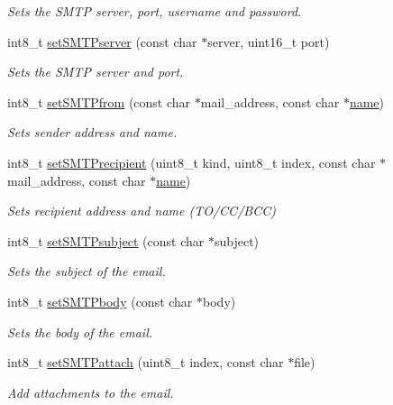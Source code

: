 \begin{DoxyCompactItemize}
\begin{DoxyCompactList}\small\item\em Sets the S\+M\+TP server, port, username and password. \end{DoxyCompactList}\item 
int8\+\_\+t \hyperlink{class_wasp3_g_aae87c677ac1163d85ee5a6ad417bd3da}{set\+S\+M\+T\+Pserver} (const char $\ast$server, uint16\+\_\+t port)
\begin{DoxyCompactList}\small\item\em Sets the S\+M\+TP server and port. \end{DoxyCompactList}\item 
int8\+\_\+t \hyperlink{class_wasp3_g_a442c2693f06c4e3c75d363ac1c715e9a}{set\+S\+M\+T\+Pfrom} (const char $\ast$mail\+\_\+address, const char $\ast$\hyperlink{_sd_fat_structs_8h_a30308c9b983377042fd2cc8900454fb1}{name})
\begin{DoxyCompactList}\small\item\em Sets sender address and name. \end{DoxyCompactList}\item 
int8\+\_\+t \hyperlink{class_wasp3_g_ad021733d2aa274a2d88cc512c1e4f8df}{set\+S\+M\+T\+Precipient} (uint8\+\_\+t kind, uint8\+\_\+t index, const char $\ast$mail\+\_\+address, const char $\ast$\hyperlink{_sd_fat_structs_8h_a30308c9b983377042fd2cc8900454fb1}{name})
\begin{DoxyCompactList}\small\item\em Sets recipient address and name (T\+O/\+C\+C/\+B\+CC) \end{DoxyCompactList}\item 
int8\+\_\+t \hyperlink{class_wasp3_g_ae6635051b128026ad05798d2a5bf4c24}{set\+S\+M\+T\+Psubject} (const char $\ast$subject)
\begin{DoxyCompactList}\small\item\em Sets the subject of the email. \end{DoxyCompactList}\item 
int8\+\_\+t \hyperlink{class_wasp3_g_a9a276ddd7e9e7da3ac1642168ef13a43}{set\+S\+M\+T\+Pbody} (const char $\ast$body)
\begin{DoxyCompactList}\small\item\em Sets the body of the email. \end{DoxyCompactList}\item 
int8\+\_\+t \hyperlink{class_wasp3_g_a34d35559ff956c88a0cc36ca5b6fd26a}{set\+S\+M\+T\+Pattach} (uint8\+\_\+t index, const char $\ast$file)
\begin{DoxyCompactList}\small\item\em Add attachments to the email. \end{DoxyCompactList}\item 

\end{DoxyCompactItemize}
